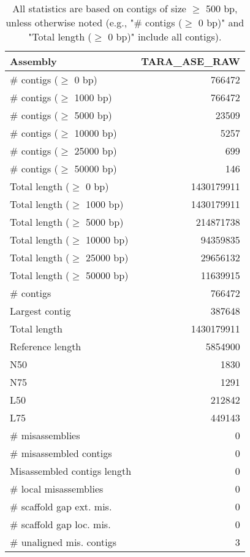 \documentclass[12pt,a4paper]{article}
\begin{document}
\begin{table}[ht]
\begin{center}
\caption{All statistics are based on contigs of size $\geq$ 500 bp, unless otherwise noted (e.g., "\# contigs ($\geq$ 0 bp)" and "Total length ($\geq$ 0 bp)" include all contigs).}
\begin{tabular}{|l*{1}{|r}|}
\hline
Assembly & TARA\_ASE\_RAW \\ \hline
\# contigs ($\geq$ 0 bp) & 766472 \\ \hline
\# contigs ($\geq$ 1000 bp) & 766472 \\ \hline
\# contigs ($\geq$ 5000 bp) & 23509 \\ \hline
\# contigs ($\geq$ 10000 bp) & 5257 \\ \hline
\# contigs ($\geq$ 25000 bp) & 699 \\ \hline
\# contigs ($\geq$ 50000 bp) & 146 \\ \hline
Total length ($\geq$ 0 bp) & 1430179911 \\ \hline
Total length ($\geq$ 1000 bp) & 1430179911 \\ \hline
Total length ($\geq$ 5000 bp) & 214871738 \\ \hline
Total length ($\geq$ 10000 bp) & 94359835 \\ \hline
Total length ($\geq$ 25000 bp) & 29656132 \\ \hline
Total length ($\geq$ 50000 bp) & 11639915 \\ \hline
\# contigs & 766472 \\ \hline
Largest contig & 387648 \\ \hline
Total length & 1430179911 \\ \hline
Reference length & 5854900 \\ \hline
N50 & 1830 \\ \hline
N75 & 1291 \\ \hline
L50 & 212842 \\ \hline
L75 & 449143 \\ \hline
\# misassemblies & 0 \\ \hline
\# misassembled contigs & 0 \\ \hline
Misassembled contigs length & 0 \\ \hline
\# local misassemblies & 0 \\ \hline
\# scaffold gap ext. mis. & 0 \\ \hline
\# scaffold gap loc. mis. & 0 \\ \hline
\# unaligned mis. contigs & 3 \\ \hline

\end{tabular}
\end{center}
\end{table}
\end{document}
